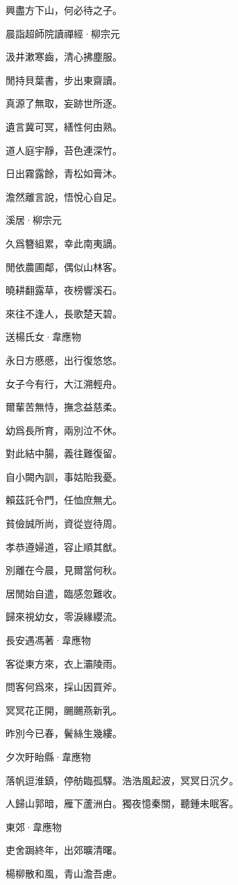 \documentclass[12pt,a4paper]{ctexbook}
\begin{document}
興盡方下山，何必待之子。\par
晨詣超師院讀禪經·柳宗元\par
汲井漱寒齒，清心拂塵服。\par
閒持貝葉書，步出東齋讀。\par
真源了無取，妄跡世所逐。\par
遺言冀可冥，繕性何由熟。\par
道人庭宇靜，苔色連深竹。\par
日出霧露餘，青松如膏沐。\par
澹然離言說，悟悅心自足。\par
溪居·柳宗元\par
久爲簪組累，幸此南夷謫。\par
閒依農圃鄰，偶似山林客。\par
曉耕翻露草，夜榜響溪石。\par
來往不逢人，長歌楚天碧。\par
送楊氏女·韋應物\par
永日方慼慼，出行復悠悠。\par
女子今有行，大江溯輕舟。\par
爾輩苦無恃，撫念益慈柔。\par
幼爲長所育，兩別泣不休。\par
對此結中腸，義往難復留。\par
自小闕內訓，事姑貽我憂。\par
賴茲託令門，任恤庶無尤。\par
貧儉誠所尚，資從豈待周。\par
孝恭遵婦道，容止順其猷。\par
別離在今晨，見爾當何秋。\par
居閒始自遣，臨感忽難收。\par
歸來視幼女，零淚緣纓流。\par
長安遇馮著·韋應物\par
客從東方來，衣上灞陵雨。\par
問客何爲來，採山因買斧。\par
冥冥花正開，颺颺燕新乳。\par
昨別今已春，鬢絲生幾縷。\par
夕次盱眙縣·韋應物\par
落帆逗淮鎮，停舫臨孤驛。浩浩風起波，冥冥日沉夕。\par
人歸山郭暗，雁下蘆洲白。獨夜憶秦關，聽鍾未眠客。\par
東郊·韋應物\par
吏舍跼終年，出郊曠清曙。\par
楊柳散和風，青山澹吾慮。\par
\end{document}

